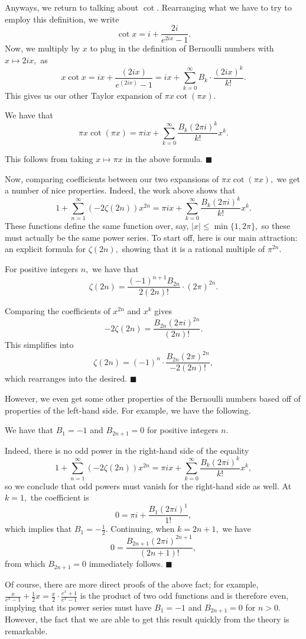 Anyways, we return to talking about $\cot.$ Rearranging what we have to try to employ this definition, we write
\[\cot x=i+\frac{2i}{e^{2ix}-1}.\]
Now, we multiply by $x$ to plug in the definition of Bernoulli numbers with $x\mapsto2ix,$ as
\[x\cot x=ix+\frac{(2ix)}{e^{(2ix)}-1}=ix+\sum_{k=0}^\infty B_k\cdot\frac{(2ix)^k}{k!}.\]
This gives us our other Taylor expansion of $\pi x\cot(\pi x).$
\begin{lemma}
    We have that
    \[\pi x\cot(\pi x)=\pi ix+\sum_{k=0}^\infty\frac{B_k(2\pi i)^k}{k!}x^k.\]
\end{lemma}
This follows from taking $x\mapsto\pi x$ in the above formula. $\blacksquare$

Now, comparing coefficients between our two expansions of $\pi x\cot(\pi x),$ we get a number of nice properties. Indeed, the work above shows that
\[1+\sum_{n=1}^\infty(-2\zeta(2n))x^{2n}=\pi ix+\sum_{k=0}^\infty\frac{B_k(2\pi i)^k}{k!}x^k.\]
These functions define the same function over, say, $|x|\le\min\{1,2\pi\},$ so these must actually be the same power series. To start off, here is our main attraction: an explicit formula for $\zeta(2n),$ showing that it is a rational multiple of $\pi^{2n}.$
\begin{theorem}
    For positive integers $n,$ we have that
    \[\zeta(2n)=\frac{(-1)^{n+1}B_{2n}}{2(2n)!}\cdot(2\pi)^{2n}.\]
\end{theorem}
Comparing the coefficients of $x^{2n}$ and $x^k$ gives
\[-2\zeta(2n)=\frac{B_{2n}(2\pi i)^{2n}}{(2n)!}.\]
This simplifies into
\[\zeta(2n)=(-1)^{n}\cdot\frac{B_{2n}(2\pi)^{2n}}{-2(2n)!},\]
which rearranges into the desired. $\blacksquare$

However, we even get some other properties of the Bernoulli numbers based off of properties of the left-hand side. For example, we have the following.
\begin{proposition}
    We have that $B_1=-1$ and $B_{2n+1}=0$ for positive integers $n.$
\end{proposition}
Indeed, there is no odd power in the right-hand side of the equality
\[1+\sum_{n=1}^\infty(-2\zeta(2n))x^{2n}=\pi ix+\sum_{k=0}^\infty\frac{B_k(2\pi i)^k}{k!}x^k,\]
so we conclude that odd powers must vanish for the right-hand side as well. At $k=1,$ the coefficient is
\[0=\pi i+\frac{B_1(2\pi i)^1}{1!},\]
which implies that $B_1=-\frac12.$ Continuing, when $k=2n+1,$ we have
\[0=\frac{B_{2n+1}(2\pi i)^{2n+1}}{(2n+1)!},\]
from which $B_{2n+1}=0$ immediately follows. $\blacksquare$

Of course, there are more direct proofs of the above fact; for example, $\frac x{e^x-1}+\frac12x=\frac x2\cdot\frac{e^x+1}{e^x-1}$ is the product of two odd functions and is therefore even, implying that its power series must have $B_1=-1$ and $B_{2n+1}=0$ for $n>0.$ However, the fact that we are able to get this result quickly from the theory is remarkable.

